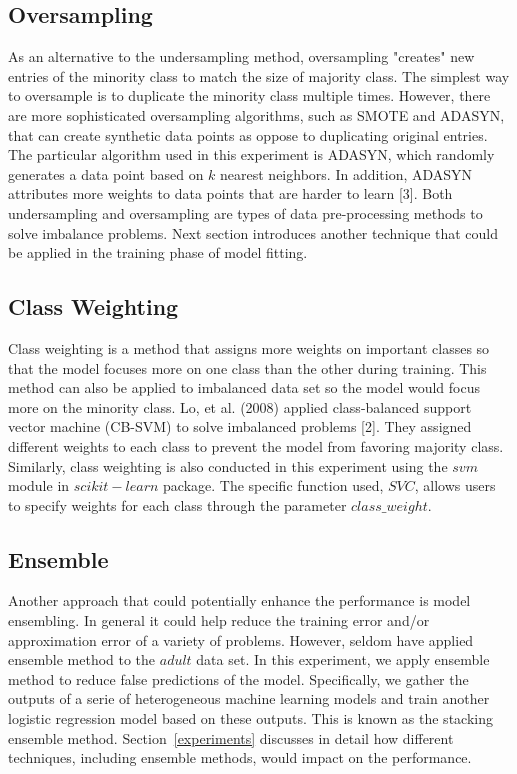 \documentclass{article}
\begin{document}
\subsection{Oversampling}
\label{oversampling}

As an alternative to the undersampling method, oversampling "creates" new entries of the minority class to match the size of majority class. The simplest way to oversample is to duplicate the minority class multiple times. However, there are more sophisticated oversampling algorithms, such as SMOTE and ADASYN, that can create synthetic data points as oppose to duplicating original entries. The particular algorithm used in this experiment is ADASYN, which randomly generates a data point based on $k$ nearest neighbors. In addition, ADASYN attributes more weights to data points that are harder to learn [3]. Both undersampling and oversampling are types of data pre-processing methods to solve imbalance problems. Next section introduces another technique that could be applied in the training phase of model fitting.

\subsection{Class Weighting}
\label{class_weighting}

Class weighting is a method that assigns more weights on important classes so that the model focuses more on one class than the other during training. This method can also be applied to imbalanced data set so the model would focus more on the minority class. Lo, et al. (2008) applied class-balanced support vector machine (CB-SVM) to solve imbalanced problems [2]. They assigned different weights to each class to prevent the model from favoring majority class. Similarly, class weighting is also conducted in this experiment using the $svm$ module in $scikit-learn$ package. The specific function used, $SVC$, allows users to specify weights for each class through the parameter $class\_weight$.

\subsection{Ensemble}
\label{ensemble}

Another approach that could potentially enhance the performance is model ensembling. In general it could help reduce the training error and/or approximation error of a variety of problems. However, seldom have applied ensemble method to the $adult$ data set. In this experiment, we apply ensemble method to reduce false predictions of the model. Specifically, we gather the outputs of a serie of heterogeneous machine learning models and train another logistic regression model based on these outputs. This is known as the stacking ensemble method. Section~\ref{experiments} discusses in detail how different techniques, including ensemble methods, would impact on the performance.
\end{document}
